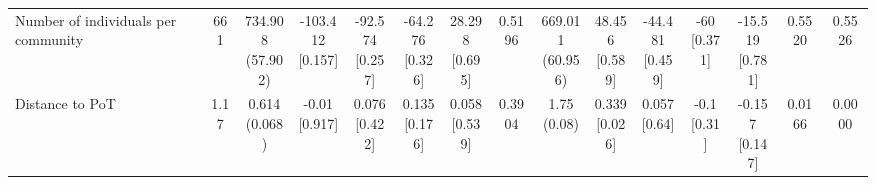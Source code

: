 {\begin{tabular}[t]{lcccccccccccccc}
Number of individuals per community & 661 & \makecell[c]{734.908\\(57.902)} & \makecell[c]{-103.412\\{[0.157]}} & \makecell[c]{-92.574\\{[0.257]}} & \makecell[c]{-64.276\\{[0.326]}} & \makecell[c]{28.298\\{[0.695]}} & 0.5196 & \makecell[c]{669.011\\(60.956)} & \makecell[c]{48.456\\{[0.589]}} & \makecell[c]{-44.481\\{[0.459]}} & \makecell[c]{-60\\{[0.371]}} & \makecell[c]{-15.519\\{[0.781]}} & 0.5520 & 0.5526\\
Distance to PoT & 1.17 & \makecell[c]{0.614\\(0.068)} & \makecell[c]{-0.01\\{[0.917]}} & \makecell[c]{0.076\\{[0.422]}} & \makecell[c]{0.135\\{[0.176]}} & \makecell[c]{0.058\\{[0.539]}} & 0.3904 & \makecell[c]{1.75\\(0.08)} & \makecell[c]{0.339\\{[0.026]}} & \makecell[c]{0.057\\{[0.64]}} & \makecell[c]{-0.1\\{[0.31]}} & \makecell[c]{-0.157\\{[0.147]}} & 0.0166 & 0.0000\\
\bottomrule
\end{tabular}}

